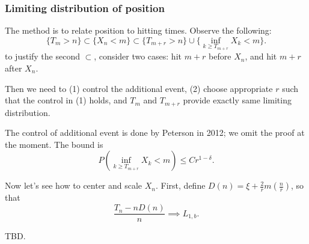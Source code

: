 \subsubsection{Limiting distribution of position}

The method is to relate position to hitting times. Observe the following:
\[
	\{T_m > n\}  \subset \{X_n < m\} \subset \{T_{m + r} > n\}  \cup \{\inf _{k \ge  T_{m + r}} X_k < m\} 
.\] 
to justify the second $\subset $, consider two cases: hit $m + r$ before $X_n$, and hit $m + r$ after $X_n$.

Then we need to (1) control the additional event, (2) choose appropriate $r$ such that the control in (1) holds, and $T_m$ and $T_{m +r}$ provide exactly same limiting distribution.

The control of additional event is done by Peterson in 2012; we omit the proof at the moment. The bound is
\[
	P\left( \inf _{k \ge  T_{m + r}} X_k < m \right) \le  C r^{1 - \delta}
.\] 

Now let's see how to center and scale $X_n$. First, define $D(n) = \xi + \frac{2}{\overline{r} } m (\frac{n}{\overline{r} })$, so that
\[
	\frac{T_n - n D(n)}{n} \implies L_{1, b}
.\] 

TBD.







